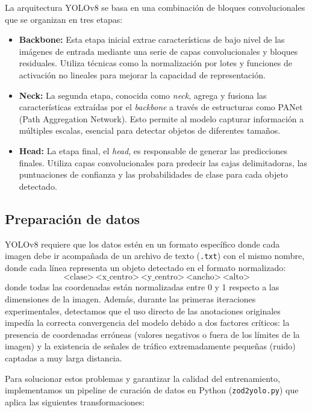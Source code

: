 \documentclass[11pt,a4paper]{article}
\begin{document}
La arquitectura YOLOv8 se basa en una combinación de bloques convolucionales que se organizan en tres etapas:

\begin{itemize}
    \item \textbf{Backbone:} Esta etapa inicial extrae características de bajo nivel de las imágenes de entrada mediante 
            una serie de capas convolucionales y bloques residuales. Utiliza técnicas como la normalización por lotes 
            y funciones de activación no lineales para mejorar la capacidad de representación.
    
    \item \textbf{Neck:} La segunda etapa, conocida como \textit{neck}, agrega y fusiona las características extraídas por el 
            \textit{backbone} a través de estructuras como PANet (Path Aggregation Network). Esto permite al modelo 
            capturar información a múltiples escalas, esencial para detectar objetos de diferentes tamaños.

    \item \textbf{Head:} La etapa final, el \textit{head}, es responsable de generar las predicciones finales. 
            Utiliza capas convolucionales para predecir las cajas delimitadoras, las puntuaciones de confianza y 
            las probabilidades de clase para cada objeto detectado.
\end{itemize}

\subsection{Preparación de datos}

YOLOv8 requiere que los datos estén en un formato específico donde cada imagen debe ir acompañada de un archivo de texto (\texttt{.txt}) 
con el mismo nombre, donde cada línea representa un objeto detectado en el formato normalizado:
\[ \text{<clase>} \ \text{<x\_centro>} \ \text{<y\_centro>} \ \text{<ancho>} \ \text{<alto>} \]
donde todas las coordenadas están normalizadas entre 0 y 1 respecto a las dimensiones de la imagen.
Además, durante las primeras iteraciones experimentales, detectamos que el uso directo de las anotaciones originales impedía la correcta convergencia del modelo 
debido a dos factores críticos: la presencia de coordenadas erróneas (valores negativos o fuera de los límites de la imagen) y la existencia 
de señales de tráfico extremadamente pequeñas (ruido) captadas a muy larga distancia.

Para solucionar estos problemas y garantizar la calidad del entrenamiento, 
implementamos un pipeline de curación de datos en Python (\texttt{zod2yolo.py}) que 
aplica las siguientes transformaciones:
\end{document}
